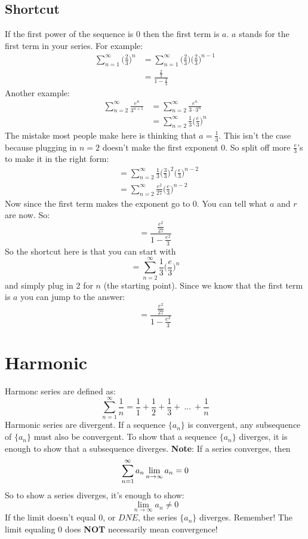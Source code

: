 \documentclass{article}
\begin{document}
    \subsection{Shortcut}
        If the first power of the sequence is 0 then the first term is $a$. $a$ stands for the first term in your series.
        For example:
        \begin{align*}
            \sum_{n=1}^{\infty} \Big ( \frac{2}{3} \Big )^n & = \sum_{n=1}^{\infty} \Big ( \frac{2}{3} \Big )\Big ( \frac{2}{3} \Big )^{n-1} \\
            & = \frac{\frac{2}{3}}{1-\frac{2}{3}}
        \end{align*}
        Another example:
        \begin{align*}
            \sum_{n=2}^{\infty} \frac{e^n}{3^{n+1}} & = \sum_{n=2}^{\infty} \frac{e^n}{3\cdot 3^n} \\
            & = \sum_{n=2}^{\infty} \frac{1}{3} \Big( \frac{e}{3}\Big)^n
        \end{align*}
        The mistake most people make here is thinking that $a = \frac{1}{3}$. This isn't the case because plugging in $n=2$ doesn't make the first exponent 0. So split off more $\frac{e}{3}$'s to make it in the right form:
        \begin{align*}
            & = \sum_{n=2}^{\infty} \frac{1}{3} \Big( \frac{3}{3} \Big)^2 \Big( \frac{e}{3} \Big) ^{n-2} \\
            & = \sum_{n=2}^{\infty} \frac{e^2}{27} \Big( \frac{e}{3} \Big) ^{n-2}
        \end{align*}
        Now since the first term makes the exponent go to 0. You can tell what $a$ and $r$ are now. So:
        $$
        = \frac{ \frac{e^2}{27} }{1- \frac{e^2}{3}}
        $$
        So the shortcut here is that you can start with
        $$
        = \sum_{n=2}^{\infty} \frac{1}{3} \Big( \frac{e}{3}\Big)^n
        $$
        and simply plug in 2 for $n$ (the starting point). Since we know that the first term is $a$ you can jump to the answer:
        $$
        = \frac{ \frac{e^2}{27} }{1- \frac{e^2}{3}}
        $$

\section{Harmonic}
    Harmonc series are defined as:
    $$
    \sum_{n=1}^{\infty} \frac{1}{n} = \frac{1}{1} + \frac{1}{2} + \frac{1}{3} +\ ...\ + \frac{1}{n}
    $$
    Harmonic series are divergent. If a sequence $\{a_n\}$ is convergent, any subsequence of $\{a_n\}$ must also be convergent. To show that a sequence $\{a_n\}$ diverges, it is enough to show that a subsequence diverges.
    \textbf{Note}: If a series converges, then
    $$
    \sum_{n=1}^{\infty} a_n \\
    \lim_{n \rightarrow \infty}^{} a_n = 0
    $$
    So to show a series diverges, it's enough to show:
    $$
    \lim_{n \rightarrow \infty} a_n \neq 0
    $$
    If the limit doesn't equal 0, or $DNE$, the series $\{a_n\}$ diverges.
    Remember! The limit equaling 0 does \textbf{NOT} necessarily mean convergence!
\end{document}
